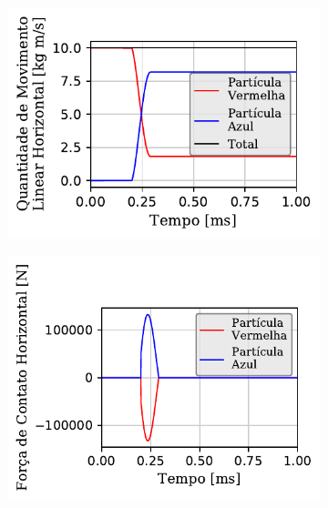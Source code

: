 \begin{figure}[htb!]
{\begin{subfigure}[t]{\smallresultsfigwidth}
			\caption{}
			\label{subfig:colliding_spheres:dissipative:x_velocity}
		\end{subfigure}
		\begin{subfigure}[t]{\smallresultsfigwidth}
			\centering
			\includegraphics[scale=1]{images/colliding_spheres/dissipative/linearMomentum-X_small_total_alternative.pdf}
			\caption{}
			\label{subfig:colliding_spheres:dissipative:x_linear_momentum}
		\end{subfigure}
		\begin{subfigure}[t]{\smallresultsfigwidth}
			\centering
			\includegraphics[scale=1]{images/colliding_spheres/dissipative/contactForce-X_small.pdf}
			\caption{}
			\label{subfig:colliding_spheres:dissipative:x_contact_force}

\end{subfigure}}
\end{figure}
